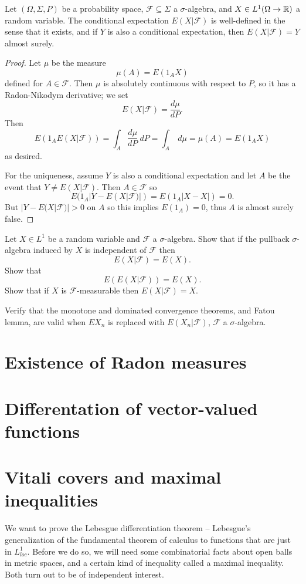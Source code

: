 \begin{corollary}
Let $(\Omega, \Sigma, P)$ be a probability space, $\mathcal F \subseteq \Sigma$ a $\sigma$-algebra, and $X \in L^{1}(\Omega \to \mathbb{R})$ a random variable.
The conditional expectation $E(X|\mathcal F)$ is well-defined in the sense that it exists, and if $Y$ is also a conditional expectation, then $E(X|\mathcal F) = Y$ almost surely.
\end{corollary}
\begin{proof}
Let $\mu$ be the measure
\[\mu(A) = E(1_{A} X)\]
defined for $A \in \mathcal F$.
Then $\mu$ is absolutely continuous with respect to $P$, so it has a Radon-Nikodym derivative; we set
\[E(X|\mathcal F) = \frac{d\mu}{dP}.\]
Then
\[E(1_{A} E(X|\mathcal F)) = \int_{A} \frac{d\mu}{dP} ~dP = \int_{A} ~d\mu = \mu(A) = E(1_{A} X)\]
as desired.

For the uniqueness, assume $Y$ is also a conditional expectation and let $A$ be the event that $Y \neq E(X|\mathcal F)$.
Then $A \in \mathcal F$ so
\[E(1_{A}|Y - E(X|\mathcal F)|) = E(1_{A}|X - X|) = 0.\]
But $|Y - E(X|\mathcal F)| > 0$ on $A$ so this implies $E(1_{A}) = 0$, thus $A$ is almost surely false.
\end{proof}

\begin{exercise}
Let $X \in L^{1}$ be a random variable and $\mathcal F$ a $\sigma$-algebra. Show that if the pullback $\sigma$-algebra induced by $X$ is independent of $\mathcal F$ then
\[E(X|\mathcal F) = E(X).\]
Show that
\[E(E(X|\mathcal F)) = E(X).\]
Show that if $X$ is $\mathcal F$-measurable then $E(X|\mathcal F) = X$.
\end{exercise}

\begin{exercise}
Verify that the monotone and dominated convergence theorems, and Fatou lemma, are valid when $EX_{n}$ is replaced with $E(X_{n}|\mathcal F)$, $\mathcal F$ a $\sigma$-algebra.
\end{exercise}

\section{Existence of Radon measures}

\section{Differentation of vector-valued functions}

\section{Vitali covers and maximal inequalities}
We want to prove the Lebesgue differentiation theorem -- Lebesgue's generalization of the fundamental theorem of calculus to functions that are just in $L^1_{loc}$.
Before we do so, we will need some combinatorial facts about open balls in metric spaces, and a certain kind of inequality called a maximal inequality.
Both turn out to be of independent interest.

